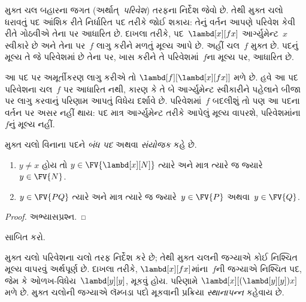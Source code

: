 \begin{explain}
મુક્ત ચલ બહારના જગત (અર્થાત્~\emph{પરિવેશ}) તરફના નિર્દેશ જેવો
છે. તેથી મુક્ત ચલો ધરાવતું પદ આંશિક રીતે નિર્ધારિત પદ તરીકે
જોઈ શકાય: તેનું વર્તન આપણે પરિવેશ કેવી રીતે ગોઠવીએ તેના પર
આધારિત છે. દાખલા તરીકે, પદ~$\lambd[x][f x]$ આર્ગ્યુમેન્ટ~$x$
સ્વીકારે છે અને તેના પર~$f$ લાગુ કરીને મળતું મૂલ્ય આપે છે.
અહીં ચલ~$f$ મુક્ત છે. પદનું મૂલ્ય તે જે પરિવેશમાં છે તેના પર,
ખાસ કરીને તે પરિવેશમાં~$f$ના મૂલ્ય પર, આધારિત છે.

આ પદ પર અમૂર્તીકરણ લાગુ કરીએ તો
$\lambd[f][\lambd[x][f
    x]]$ મળે છે. હવે આ પદ પરિવેશના ચલ~$f$ પર આધારિત નથી,
કારણ કે તે બે આર્ગ્યુમેન્ટ સ્વીકારીને પહેલાને બીજા પર લાગુ
કરવાનું પરિણામ આપતું વિધેય દર્શાવે છે. પરિવેશમાં~$f$ બદલીશું
તો પણ આ પદના વર્તન પર અસર નહીં થાય: પદ માત્ર આર્ગ્યુમેન્ટ
તરીકે આપેલું મૂલ્ય વાપરશે, પરિવેશમાંના~$f$નું મૂલ્ય નહીં.
\end{explain}

\begin{defn}[બંધ પદ, સંયોજક]
  મુક્ત ચલો વિનાના પદને \emph{બંધ પદ} અથવા
  \emph{સંયોજક} કહે છે.
\end{defn}

\begin{lem}
  \begin{enumerate}
    \item {} $y \neq x$ હોય તો
      $y \in \FV{\lambd[x][N]}$ ત્યારે અને માત્ર ત્યારે જ
      જ્યારે~$y \in \FV{N}$.
    \item {} $y \in \FV{PQ}$ ત્યારે અને માત્ર
      ત્યારે જ જ્યારે~$y \in \FV{P}$ અથવા~$y
      \in \FV{Q}$.
    \end{enumerate}
\end{lem}

\begin{proof}
  અભ્યાસપ્રશ્ન.
\end{proof}

\begin{prob}
   સાબિત કરો.
\end{prob}
\endgroup


\begingroup
\makeatletter{}\makeatother

\label{guunit:OLP-0361}


\begin{explain}
મુક્ત ચલો પરિવેશના ચલો તરફ નિર્દેશ કરે છે; તેથી મુક્ત ચલની
જગ્યાએ કોઈ નિશ્ચિત મૂલ્ય વાપરવું અર્થપૂર્ણ છે. દાખલા તરીકે,
$\lambd[x][f x]$માંના~$f$ની જગ્યાએ નિશ્ચિત પદ, જેમ કે
ઓળખ-વિધેય~$\lambd[y][y]$, મૂકવું હોય. પરિણામે
$\lambd[x][(\lambd[y][y]) x]$ મળે છે. મુક્ત ચલોની જગ્યાએ
લૅમ્બડા પદો મૂકવાની પ્રક્રિયા \emph{સ્થાનાપન્ન} કહેવાય છે.
\end{explain}

